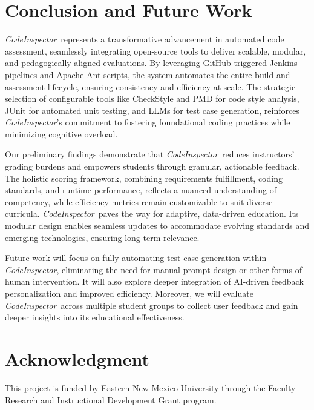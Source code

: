 \documentclass[conference]{IEEEtran}
\newcommand{\codeinspector}{\textit{CodeInspector}\ }
\newcommand{\codeinspectoren}{\textit{CodeInspector}}
\begin{document}

\section{Conclusion and Future Work}\label{sec:conclusions}
\codeinspector represents a transformative advancement in automated code assessment, seamlessly integrating open-source tools to deliver scalable, modular, and pedagogically aligned evaluations. By leveraging GitHub-triggered Jenkins pipelines and Apache Ant scripts, the system automates the entire build and assessment lifecycle, ensuring consistency and efficiency at scale. The strategic selection of configurable tools like CheckStyle and PMD for code style analysis, JUnit for automated unit testing, and LLMs for test case generation, reinforces \codeinspectoren’s commitment to fostering foundational coding practices while minimizing cognitive overload.

Our preliminary findings demonstrate that \codeinspector reduces instructors’ grading burdens and empowers students through granular, actionable feedback.
The holistic scoring framework, combining requirements fulfillment, coding standards, and runtime performance, reflects a nuanced understanding of competency, while efficiency metrics remain customizable to suit diverse curricula. \codeinspector paves the way for adaptive, data-driven education. Its modular design enables seamless updates to accommodate evolving standards and emerging technologies, ensuring long-term relevance.

Future work will focus on fully automating test case generation within \codeinspectoren, eliminating the need for manual prompt design or other forms of human intervention. It will also explore deeper integration of AI-driven feedback personalization and improved efficiency. Moreover, we will evaluate \codeinspector across multiple student groups to collect user feedback and gain deeper insights into its educational effectiveness.

\section*{Acknowledgment}
This project is funded by Eastern New Mexico University through the Faculty Research and Instructional Development Grant program.


\balance

\end{document}
